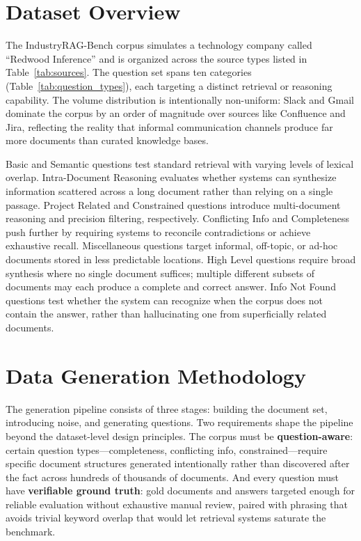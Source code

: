 \documentclass{article}
\begin{document}
\section{Dataset Overview}
\label{sec:overview}

The IndustryRAG-Bench corpus simulates a technology company called ``Redwood Inference'' and is organized across the source types listed in Table~\ref{tab:sources}. The question set spans ten categories (Table~\ref{tab:question_types}), each targeting a distinct retrieval or reasoning capability. The volume distribution is intentionally non-uniform: Slack and Gmail dominate the corpus by an order of magnitude over sources like Confluence and Jira, reflecting the reality that informal communication channels produce far more documents than curated knowledge bases.

Basic and Semantic questions test standard retrieval with varying levels of lexical overlap. Intra-Document Reasoning evaluates whether systems can synthesize information scattered across a long document rather than relying on a single passage. Project Related and Constrained questions introduce multi-document reasoning and precision filtering, respectively. Conflicting Info and Completeness push further by requiring systems to reconcile contradictions or achieve exhaustive recall. Miscellaneous questions target informal, off-topic, or ad-hoc documents stored in less predictable locations. High Level questions require broad synthesis where no single document suffices; multiple different subsets of documents may each produce a complete and correct answer. Info Not Found questions test whether the system can recognize when the corpus does not contain the answer, rather than hallucinating one from superficially related documents.

\section{Data Generation Methodology}
\label{sec:methodology}

The generation pipeline consists of three stages: building the document set, introducing noise, and generating questions. Two requirements shape the pipeline beyond the dataset-level design principles. The corpus must be \textbf{question-aware}: certain question types---completeness, conflicting info, constrained---require specific document structures generated intentionally rather than discovered after the fact across hundreds of thousands of documents. And every question must have \textbf{verifiable ground truth}: gold documents and answers targeted enough for reliable evaluation without exhaustive manual review, paired with phrasing that avoids trivial keyword overlap that would let retrieval systems saturate the benchmark.
\end{document}
